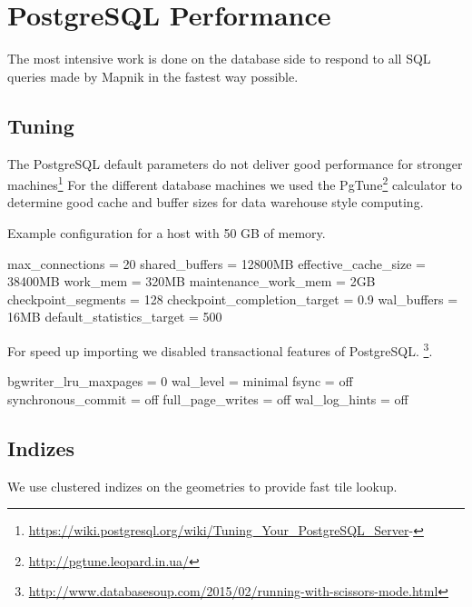 \section{PostgreSQL Performance}
\label{postgres-performance}

The most intensive work is done on the database side to respond to all SQL queries
made by Mapnik in the fastest way possible.

\subsection{Tuning}

The PostgreSQL default parameters do not deliver good performance for stronger machines\footnote{\url{https://wiki.postgresql.org/wiki/Tuning_Your_PostgreSQL_Server}-}
For the different database machines we used the PgTune\footnote{\url{http://pgtune.leopard.in.ua/}} calculator to determine good cache and buffer sizes for data warehouse style computing.

Example configuration for a host with 50 GB of memory.

\begin{bashcode}
max_connections = 20
shared_buffers = 12800MB
effective_cache_size = 38400MB
work_mem = 320MB
maintenance_work_mem = 2GB
checkpoint_segments = 128
checkpoint_completion_target = 0.9
wal_buffers = 16MB
default_statistics_target = 500
\end{bashcode}

For speed up importing we disabled transactional features of PostgreSQL. \footnote{\url{http://www.databasesoup.com/2015/02/running-with-scissors-mode.html}}.

\begin{bashcode}
bgwriter_lru_maxpages = 0
wal_level = minimal
fsync = off
synchronous_commit = off
full_page_writes = off
wal_log_hints = off
\end{bashcode}


\subsection{Indizes}

We use clustered indizes on the geometries to provide fast tile lookup.
